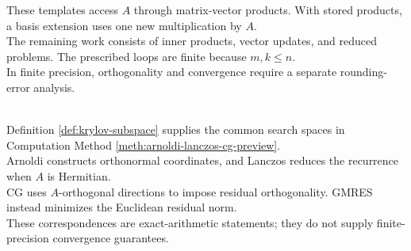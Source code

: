 \begin{computationmethod}
\begin{enumerate}[label=(\roman*)]
\end{enumerate}
These templates access $A$ through matrix-vector products. With stored products, a basis extension uses one new multiplication by $A$.\\
The remaining work consists of inner products, vector updates, and reduced problems. The prescribed loops are finite because $m,k\leq n$.\\
In finite precision, orthogonality and convergence require a separate rounding-error analysis.
\end{computationmethod}

\begin{perspective} \label{per:krylov-methods-preview} \\
Definition \ref{def:krylov-subspace} supplies the common search spaces in Computation Method \ref{meth:arnoldi-lanczos-cg-preview}.\\
Arnoldi constructs orthonormal coordinates, and Lanczos reduces the recurrence when $A$ is Hermitian.\\
CG uses $A$-orthogonal directions to impose residual orthogonality. GMRES instead minimizes the Euclidean residual norm.\\
These correspondences are exact-arithmetic statements; they do not supply finite-precision convergence guarantees.
\end{perspective}
